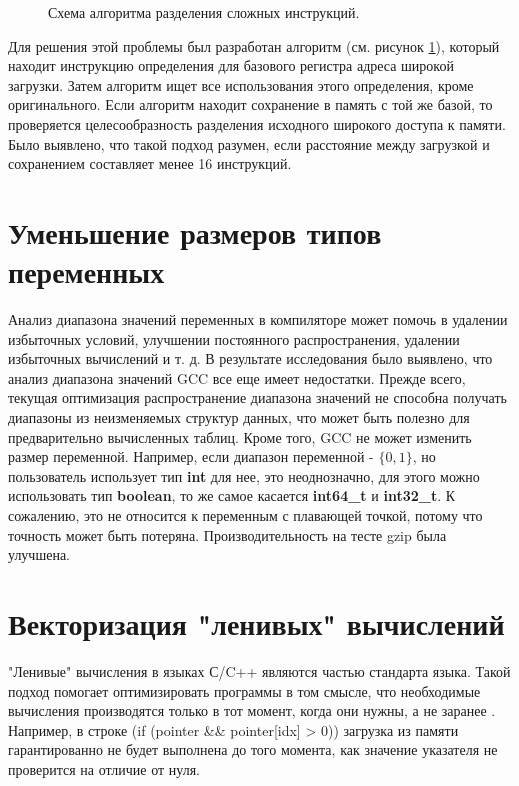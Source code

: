 \begin{figure}[htbp]
	\centering
	
	\caption{Схема алгоритма разделения сложных инструкций.}
	\label{splitsvg2}
\end{figure}

Для решения этой проблемы был разработан алгоритм (см. рисунок \ref{splitsvg2}), который находит инструкцию определения для базового регистра адреса широкой загрузки. Затем алгоритм ищет все использования этого определения, кроме оригинального. Если алгоритм находит сохранение в память с той же базой, то проверяется целесообразность разделения исходного широкого доступа к памяти. Было выявлено, что такой подход разумен, если расстояние между загрузкой и сохранением составляет менее 16 инструкций.

 \section {Уменьшение размеров типов переменных}
 Анализ диапазона значений переменных в компиляторе \cite{harrison1977compiler,  simon2008value}  может помочь в удалении избыточных условий, улучшении постоянного распространения, удалении избыточных вычислений и т. д. В результате исследования было выявлено, что анализ диапазона значений GCC все еще имеет недостатки. Прежде всего, текущая оптимизация распространение диапазона значений не способна получать диапазоны из неизменяемых структур данных, что может быть полезно для предварительно вычисленных таблиц. Кроме того, GCC не может изменить размер переменной. Например, если диапазон переменной - $\{0, 1\}$, но пользователь использует тип \textbf{int} для нее, это неоднозначно, для этого можно использовать тип \textbf{boolean}, то же самое касается \textbf{int64\_t} и \textbf{int32\_t}. К сожалению, это не относится к переменным с плавающей точкой, потому что точность может быть потеряна. Производительность на тесте gzip была улучшена.
 
 \section {Векторизация "ленивых"\phantom{ } вычислений}\label{ch2:lcv}
 "Ленивые"\phantom{ } вычисления в языках С/C++ являются частью стандарта языка. Такой подход помогает оптимизировать программы в том смысле, что необходимые вычисления производятся только в тот момент, когда они нужны, а не заранее \cite{cukic2018functional}. Например, в строке (if (pointer \&\& pointer[idx] > 0)) загрузка из памяти гарантированно  не будет выполнена до того момента, как значение указателя не проверится на отличие от нуля. 
 
